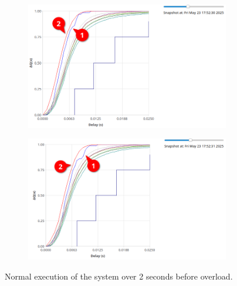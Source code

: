         \begin{figure}[H]
            \centering
            \begin{subfigure}{.5\textwidth}
                \centering
                \includegraphics[width=0.98\textwidth]{img/norm_ex_32.png}
                \label{fig:norm_ex_1}
            \end{subfigure}%
            \begin{subfigure}{.5\textwidth}
                \centering
                \includegraphics[width =0.98\textwidth]{img/normal.png}
                \label{fig:norm_ex_2}
            \end{subfigure}
            \label{fig:norm_ex}
            \caption{Normal execution of the system over 2 seconds before overload.}
            \end{figure}
        
